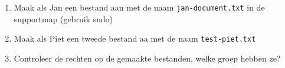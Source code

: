 \begin{enumerate}
\item Maak als Jan een bestand aan met de naam \texttt{jan-document.txt} in de supportmap (gebruik sudo)
\item Maak als Piet een tweede bestand aa met de naam \texttt{test-piet.txt}
\item Controleer de rechten op de gemaakte bestanden, welke groep hebben ze?
\end{enumerate}

